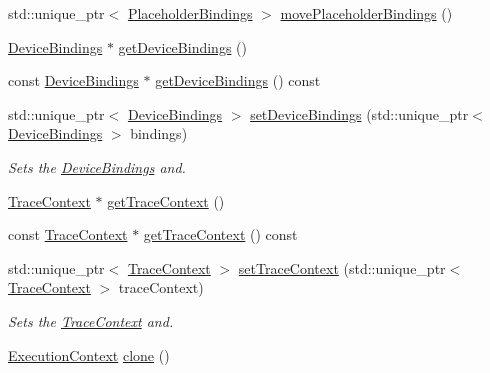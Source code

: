 \begin{DoxyCompactItemize}
std\+::unique\+\_\+ptr$<$ \hyperlink{classglow_1_1_placeholder_bindings}{Placeholder\+Bindings} $>$ \hyperlink{classglow_1_1_execution_context_ab16953545c9c9c181083425f8e319a17}{move\+Placeholder\+Bindings} ()
\item 
\hyperlink{classglow_1_1_device_bindings}{Device\+Bindings} $\ast$ \hyperlink{classglow_1_1_execution_context_ae85ee88daa4fe05462d263357f04b37d}{get\+Device\+Bindings} ()
\item 
const \hyperlink{classglow_1_1_device_bindings}{Device\+Bindings} $\ast$ \hyperlink{classglow_1_1_execution_context_ad618b65cd4698dbe9bac4e442e0c8750}{get\+Device\+Bindings} () const
\item 
std\+::unique\+\_\+ptr$<$ \hyperlink{classglow_1_1_device_bindings}{Device\+Bindings} $>$ \hyperlink{classglow_1_1_execution_context_a557287e56fe650dd6f3ce11109d3788d}{set\+Device\+Bindings} (std\+::unique\+\_\+ptr$<$ \hyperlink{classglow_1_1_device_bindings}{Device\+Bindings} $>$ bindings)
\begin{DoxyCompactList}\small\item\em Sets the \hyperlink{classglow_1_1_device_bindings}{Device\+Bindings} and. \end{DoxyCompactList}\item 
\hyperlink{classglow_1_1_trace_context}{Trace\+Context} $\ast$ \hyperlink{classglow_1_1_execution_context_a45f5097c2594757a50c7c9579b2d2ed9}{get\+Trace\+Context} ()
\item 
const \hyperlink{classglow_1_1_trace_context}{Trace\+Context} $\ast$ \hyperlink{classglow_1_1_execution_context_a2a7b10635c0b5d13f7234b3edc1ea30d}{get\+Trace\+Context} () const
\item 
std\+::unique\+\_\+ptr$<$ \hyperlink{classglow_1_1_trace_context}{Trace\+Context} $>$ \hyperlink{classglow_1_1_execution_context_a72b3080f584f93d53717c9c083222559}{set\+Trace\+Context} (std\+::unique\+\_\+ptr$<$ \hyperlink{classglow_1_1_trace_context}{Trace\+Context} $>$ trace\+Context)
\begin{DoxyCompactList}\small\item\em Sets the \hyperlink{classglow_1_1_trace_context}{Trace\+Context} and. \end{DoxyCompactList}\item 
\mbox{\label{classglow_1_1_execution_context_a685f89c25b5b17a15d82b406f966f335}} 
\hyperlink{classglow_1_1_execution_context}{Execution\+Context} \hyperlink{classglow_1_1_execution_context_a685f89c25b5b17a15d82b406f966f335}{clone} ()

\end{DoxyCompactItemize}
